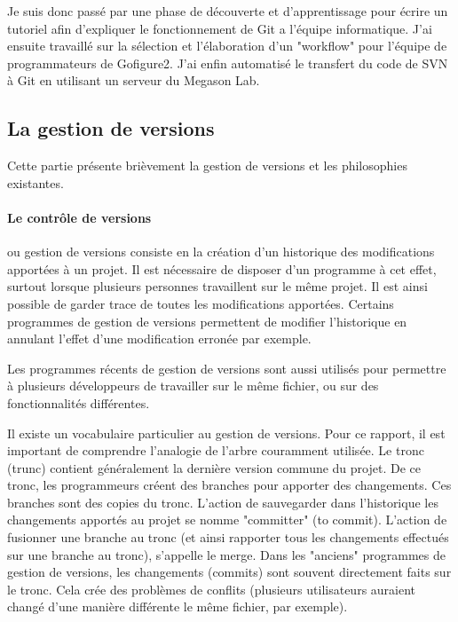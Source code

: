 Je suis donc passé par une phase de découverte et d'apprentissage pour écrire un tutoriel 
afin d'expliquer le fonctionnement de Git a l'équipe informatique. J'ai ensuite travaillé sur la sélection et l'élaboration d'un "workflow"
pour l'équipe de programmateurs de Gofigure2.
J'ai enfin automatisé le transfert du code de SVN à Git en utilisant un serveur du Megason Lab.



\subsection{La gestion de versions}

Cette partie présente brièvement la gestion de versions et les philosophies existantes.

\paragraph{Le contrôle de versions} ou gestion de versions consiste en
la création d'un historique des modifications apportées à un projet.
Il est nécessaire de disposer d'un programme à cet effet,
surtout lorsque plusieurs personnes travaillent sur le même projet.
Il est ainsi possible de garder trace de toutes les modifications apportées.
Certains programmes de gestion de versions permettent
de modifier l'historique en annulant l'effet d'une modification erronée par exemple.

Les programmes récents de gestion de versions sont aussi utilisés
pour permettre à plusieurs développeurs de travailler 
sur le même fichier, ou sur des fonctionnalités différentes.

Il existe un vocabulaire particulier au gestion de versions.
Pour ce rapport, il est important de comprendre l'analogie de l'arbre couramment utilisée.
Le tronc (trunc) contient généralement la dernière version commune du projet.
De ce tronc, les programmeurs créent des branches pour apporter des changements.
Ces branches sont des copies du tronc.
L'action de sauvegarder dans l'historique les changements apportés au projet se nomme "committer" (to commit).
L'action de fusionner une branche au tronc
(et ainsi rapporter tous les changements effectués sur une branche au tronc), s'appelle le merge.
Dans les  "anciens" programmes de gestion de versions,
les changements (commits) sont souvent directement faits sur le tronc.
Cela crée des problèmes de conflits
(plusieurs utilisateurs auraient changé d'une manière différente le même fichier, par exemple).

